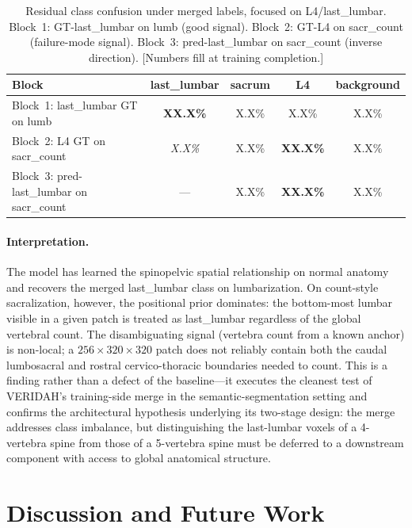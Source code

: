 \documentclass{article}
\newcommand{\VERIDAH}{VERIDAH}
\begin{document}
\begin{table}[t]
\caption{Residual class confusion under merged labels,
focused on L4/last\_lumbar. Block~1: GT-last\_lumbar on
lumb (good signal). Block~2: GT-L4 on sacr\_count
(failure-mode signal). Block~3: pred-last\_lumbar on
sacr\_count (inverse direction). [Numbers fill at training
completion.]}
\label{tab:confusion_blocks}
\centering
\small
\begin{tabular}{lcccc}
\toprule
\bfseries Block & last\_lumbar & sacrum & L4 & background \\
\midrule
Block~1: last\_lumbar GT on lumb        & \textbf{XX.X\%} & X.X\% & X.X\% & X.X\% \\
Block~2: L4 GT on sacr\_count           & \emph{X.X\%}    & X.X\% & \textbf{XX.X\%} & X.X\% \\
Block~3: pred-last\_lumbar on sacr\_count & ---           & X.X\% & \textbf{XX.X\%} & X.X\% \\
\bottomrule
\end{tabular}
\end{table}

\paragraph{Interpretation.}
The model has learned the spinopelvic spatial relationship
on normal anatomy and recovers the merged last\_lumbar
class on lumbarization. On count-style sacralization,
however, the positional prior dominates: the bottom-most
lumbar visible in a given patch is treated as
last\_lumbar regardless of the global vertebral count.
The disambiguating signal (vertebra count from a known
anchor) is non-local; a $256{\times}320{\times}320$
patch does not reliably contain both the caudal
lumbosacral and rostral cervico-thoracic boundaries
needed to count. This is a finding rather than a defect
of the baseline---it executes the cleanest test of
\VERIDAH{}'s training-side merge in the
semantic-segmentation setting and confirms the
architectural hypothesis underlying its two-stage
design: the merge addresses class imbalance, but
distinguishing the last-lumbar voxels of a 4-vertebra
spine from those of a 5-vertebra spine must be deferred
to a downstream component with access to global
anatomical structure.

\section{Discussion and Future Work}
\label{sec:discussion}
\end{document}
